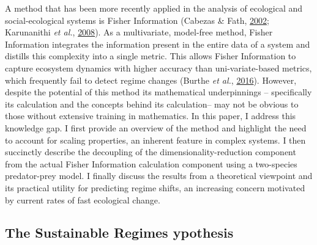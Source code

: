 \documentclass[12pt,twoside,openany]{reedthesis}
\begin{document}
A method that has been more recently applied in the analysis of ecological and social-ecological systems is Fisher Information (Cabezas \& Fath, \protect\hyperlink{ref-cabezas_towards_2002}{2002}; Karunanithi \emph{et al.}, \protect\hyperlink{ref-karunanithi_detection_2008}{2008}). As a multivariate, model-free method, Fisher Information integrates the information present in the entire data of a system and distills this complexity into a single metric. This allows Fisher Information to capture ecosystem dynamics with higher accuracy than uni-variate-based metrics, which frequently fail to detect regime changes (Burthe \emph{et al.}, \protect\hyperlink{ref-burthe2016early}{2016}). However, despite the potential of this method its mathematical underpinnings -- specifically its calculation and the concepts behind its calculation-- may not be obvious to those without extensive training in mathematics. In this paper, I address this knowledge gap. I first provide an overview of the method and highlight the need to account for scaling properties, an inherent feature in complex systems. I then succinctly describe the decoupling of the dimensionality-reduction component from the actual Fisher Information calculation component using a two-species predator-prey model. I finally discuss the results from a theoretical viewpoint and its practical utility for predicting regime shifts, an increasing concern motivated by current rates of fast ecological change.

\hypertarget{the-sustainable-regimes-ypothesis}{%
\subsection{The Sustainable Regimes ypothesis}\label{the-sustainable-regimes-ypothesis}}
\end{document}
